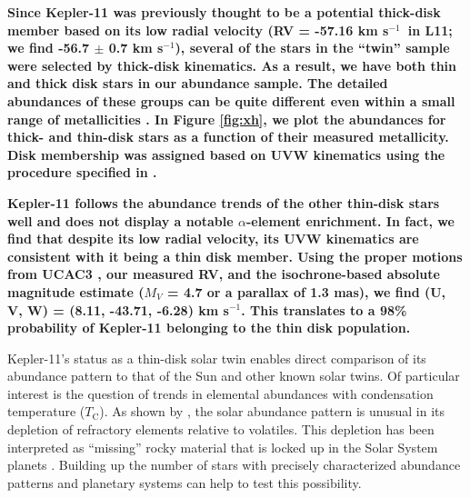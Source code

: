 \documentclass[twocolumn]{aastex61}
\newcommand{\tc}{$T_\mathrm{C}$}
\newcommand{\kms}{km s$^{-1}$}
\begin{document}
\textbf{Since Kepler-11 was previously thought to be a potential thick-disk member based on its low radial velocity (RV = -57.16 \kms\ in L11; we find -56.7 $\pm$ 0.7 \kms), several of the stars in the ``twin'' sample were selected by thick-disk kinematics. As a result, we have both thin and thick disk stars in our abundance sample. The detailed abundances of these groups can be quite different even within a small range of metallicities \citep[see e.g.][]{Liu2016}. In Figure \ref{fig:xh}, we plot the abundances for thick- and thin-disk stars as a function of their measured metallicity. Disk membership was assigned based on UVW kinematics using the procedure specified in \citet{Reddy2006}. }

\textbf{Kepler-11 follows the abundance trends of the other thin-disk stars well and does not display a notable $\alpha$-element enrichment. In fact, we find that despite its low radial velocity, its UVW kinematics are consistent with it being a thin disk member. Using the proper motions from UCAC3 \citep{ucac3}, our measured RV, and the isochrone-based absolute magnitude estimate ($M_V$ = 4.7 or a parallax of 1.3 mas), we find (U, V, W) = (8.11, -43.71, -6.28) \kms. This translates to a 98\% probability of Kepler-11 belonging to the thin disk population.}

Kepler-11's status as a thin-disk solar twin enables direct comparison of its abundance pattern to that of the Sun and other known solar twins. Of particular interest is the question of trends in elemental abundances with condensation temperature (\tc). As shown by \citet{Melendez2009}, the solar abundance pattern is unusual in its depletion of refractory elements relative to volatiles. This depletion has been interpreted as ``missing'' rocky material that is locked up in the Solar System planets \citep{Chambers2010}. Building up the number of stars with precisely characterized abundance patterns and planetary systems can help to test this possibility.
\end{document}
